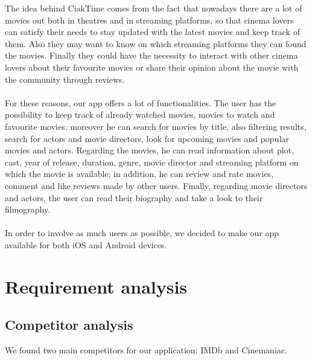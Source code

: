 \documentclass[12pt, a4paper]{article}
\begin{document}
The idea behind CiakTime comes from the fact that nowadays there are a lot of movies out
both in theatres and in streaming platforms, so that cinema lovers can satisfy their
needs to stay updated with the latest movies and keep track of them.
Also they may want to know on which streaming platforms they can found the movies.
Finally they could have the necessity to interact with other cinema lovers about their
favourite movies or share their opinion about the movie with the community through reviews.
\\\\
For these reasons, our app offers a lot of functionalities.
The user has the possibility to keep track of already watched movies, movies to watch and favourite movies;
moreover he can search for movies by title, also filtering results, search for actors and movie directors,
look for upcoming movies and popular movies and actors.
Regarding the movies, he can read information about plot, cast, year of release, duration, genre,
movie director and streaming platform on which the movie is available; in addition, he can
review and rate movies, comment and like reviews made by other users.
Finally, regarding movie directors and actors, the user can read their biography and take a look to their
filmography.
\\\\
In order to involve as much users as possible, we decided to make our app available for both iOS and Android devices.






\newpage

\section{Requirement analysis}


\subsection{Competitor analysis}
We found two main competitors for our application: IMDb and Cinemaniac.
\end{document}
